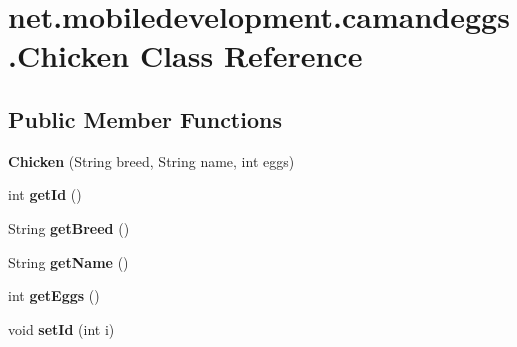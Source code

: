 \hypertarget{classnet_1_1mobiledevelopment_1_1camandeggs_1_1_chicken}{}\section{net.\+mobiledevelopment.\+camandeggs.\+Chicken Class Reference}
\label{classnet_1_1mobiledevelopment_1_1camandeggs_1_1_chicken}
\subsection*{Public Member Functions}
\begin{DoxyCompactItemize}
\item 
\mbox{\label{classnet_1_1mobiledevelopment_1_1camandeggs_1_1_chicken_a2d82f4036bdfcaca684ed35993f240b0}} 
{\bfseries Chicken} (String breed, String name, int eggs)
\item 
\mbox{\label{classnet_1_1mobiledevelopment_1_1camandeggs_1_1_chicken_aacfd65b4dc4cb8ca1b943984cd6146cc}} 
int {\bfseries get\+Id} ()
\item 
\mbox{\label{classnet_1_1mobiledevelopment_1_1camandeggs_1_1_chicken_ac89daa24b9542bf1ae27d4660af3ed21}} 
String {\bfseries get\+Breed} ()
\item 
\mbox{\label{classnet_1_1mobiledevelopment_1_1camandeggs_1_1_chicken_ad4eadd64e830742fd6d7ab6c18f69120}} 
String {\bfseries get\+Name} ()
\item 
\mbox{\label{classnet_1_1mobiledevelopment_1_1camandeggs_1_1_chicken_ac3505ec5a1ca3984e6f048ce305ce9bc}} 
int {\bfseries get\+Eggs} ()
\item 
\mbox{\label{classnet_1_1mobiledevelopment_1_1camandeggs_1_1_chicken_a829e2e8817d0f563d86178c514c55b7a}} 
void {\bfseries set\+Id} (int i)
\item 
\mbox{\label{classnet_1_1mobiledevelopment_1_1camandeggs_1_1_chicken_aa185542428bb81aaba3f6bbd1f4f15df}} 

\end{DoxyCompactItemize}
